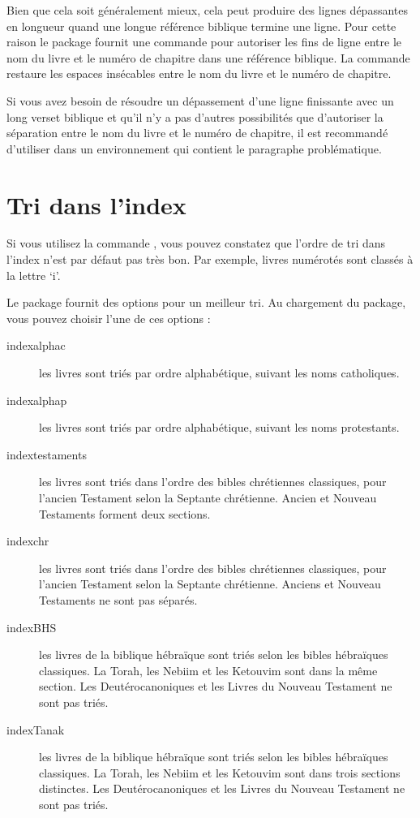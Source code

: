 \documentclass{ltxdoc}
\begin{document}
Bien que cela soit généralement mieux, cela peut produire des lignes dépassantes en longueur quand une longue référence biblique termine une ligne.
Pour cette raison le package fournit une commande  pour autoriser les fins de ligne entre le nom du livre et le numéro de chapitre dans une référence biblique.
La commande  restaure les espaces insécables entre le nom du livre et le numéro de chapitre.

Si vous avez besoin de résoudre un dépassement d'une ligne finissante avec un long verset biblique et qu'il n'y a pas d'autres possibilités que d'autoriser la séparation entre le nom du livre et le numéro de chapitre, il est recommandé d'utiliser  dans un environnement qui contient le paragraphe problématique.

\section{Tri dans l'index}
 Si vous utilisez la commande , vous pouvez constatez que l'ordre de tri dans l'index n'est par défaut pas très bon. Par exemple, livres numérotés sont classés à la lettre `i'. 

Le package fournit des options pour un meilleur tri. Au chargement du package, vous pouvez choisir l'une de ces options :
 \begin{description}
 \item[indexalphac]les livres sont triés par ordre alphabétique, suivant les noms catholiques.
\item[indexalphap]les livres sont triés par ordre alphabétique, suivant les noms protestants.
\item[indextestaments]les livres sont triés dans l'ordre des bibles chrétiennes classiques, pour l'ancien Testament  selon la Septante chrétienne. Ancien et Nouveau Testaments forment deux sections.
\item[indexchr]les livres sont triés dans l'ordre des bibles chrétiennes classiques, pour l'ancien Testament  selon la Septante chrétienne. Anciens et Nouveau Testaments ne sont pas séparés.
\item[indexBHS]les livres de la biblique hébraïque sont triés selon les bibles hébraïques classiques. La Torah, les Nebiim et les Ketouvim sont dans la même section. Les Deutérocanoniques et les Livres du Nouveau Testament ne sont pas triés.
\item[indexTanak]les livres de la biblique hébraïque sont triés selon les bibles hébraïques classiques. La Torah, les Nebiim et les Ketouvim sont dans trois sections distinctes. Les Deutérocanoniques et les Livres du Nouveau Testament ne sont pas triés.
\end{description}
\end{document}
